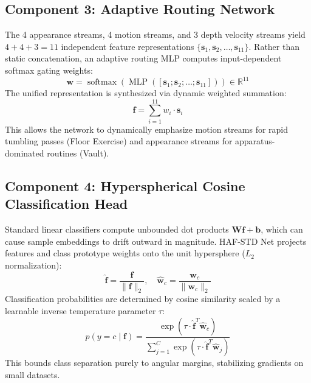 \documentclass[a4paper, 11pt]{article}
\begin{document}
\subsection{Component 3: Adaptive Routing Network}
The 4 appearance streams, 4 motion streams, and 3 depth velocity streams yield $4 + 4 + 3 = 11$ independent feature representations $\{\mathbf{s}_1, \mathbf{s}_2, \dots, \mathbf{s}_{11}\}$. Rather than static concatenation, an adaptive routing MLP computes input-dependent softmax gating weights:
\begin{equation}
    \mathbf{w} = \operatorname{softmax}\left(\operatorname{MLP}\left([\mathbf{s}_1; \mathbf{s}_2; \dots; \mathbf{s}_{11}]\right)\right) \in \mathbb{R}^{11}
\end{equation}
The unified representation is synthesized via dynamic weighted summation:
\begin{equation}
    \mathbf{f} = \sum_{i=1}^{11} w_i \cdot \mathbf{s}_i
\end{equation}
This allows the network to dynamically emphasize motion streams for rapid tumbling passes (Floor Exercise) and appearance streams for apparatus-dominated routines (Vault).

\subsection{Component 4: Hyperspherical Cosine Classification Head}
Standard linear classifiers compute unbounded dot products $\mathbf{W}\mathbf{f} + \mathbf{b}$, which can cause sample embeddings to drift outward in magnitude. HAF-STD Net projects features and class prototype weights onto the unit hypersphere ($L_2$ normalization):
\begin{equation}
    \hat{\mathbf{f}} = \frac{\mathbf{f}}{\|\mathbf{f}\|_2}, \quad \hat{\mathbf{w}}_c = \frac{\mathbf{w}_c}{\|\mathbf{w}_c\|_2}
\end{equation}
Classification probabilities are determined by cosine similarity scaled by a learnable inverse temperature parameter $\tau$:
\begin{equation}
    p(y=c \mid \mathbf{f}) = \frac{\exp\left(\tau \cdot \hat{\mathbf{f}}^T \hat{\mathbf{w}}_c\right)}{\sum_{j=1}^{C} \exp\left(\tau \cdot \hat{\mathbf{f}}^T \hat{\mathbf{w}}_j\right)}
\end{equation}
This bounds class separation purely to angular margins, stabilizing gradients on small datasets.

\end{document}
